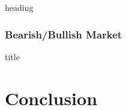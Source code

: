 \documentclass[12pt, a4paper]{article}
\begin{document}
		\begin{table}[htbp]
			\centering
			\caption{heading}
			\label{BigBusinessGroup}
			\resizebox{0.7\textwidth}{!}{
				
			}
		\end{table}




\subsubsection{Bearish/Bullish Market}{}
	\begin{table}[htbp]
		\centering
		\caption{title}
		\label{mresult2Down}
		\resizebox{1\textwidth}{!}{
			
		}
	\end{table}

\FloatBarrier

\section{Conclusion}
\end{document}
